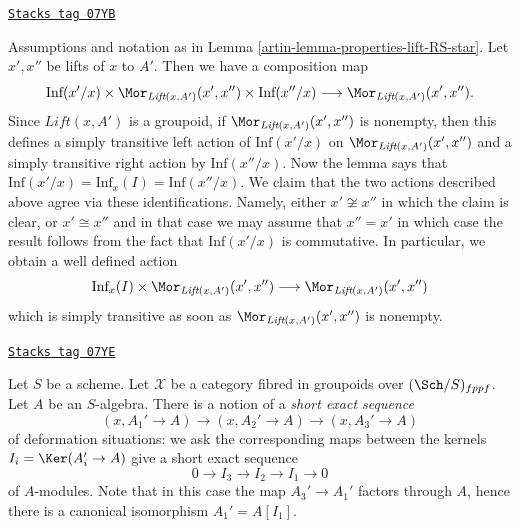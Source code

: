 \begin{remark}[Automorphisms]

\label{artin-remark-automorphisms}
\href{https://stacks.math.columbia.edu/tag/07YB}{\texttt{Stacks tag 07YB}}

Assumptions and notation as in Lemma \ref{artin-lemma-properties-lift-RS-star}.
Let $x', x''$ be lifts of $x$ to $A'$. Then we have a composition
map
$$
\text{Inf}(x'/x) \times
\Mor_{\textit{Lift}(x, A')}(x', x'') \times \text{Inf}(x''/x)
\longrightarrow
\Mor_{\textit{Lift}(x, A')}(x', x'').
$$
Since $\textit{Lift}(x, A')$ is a groupoid, if
$\Mor_{\textit{Lift}(x, A')}(x', x'')$ is nonempty, then this defines
a simply transitive left action of $\text{Inf}(x'/x)$ on
$\Mor_{\textit{Lift}(x, A')}(x', x'')$ and a simply transitive
right action by $\text{Inf}(x''/x)$. Now the lemma says that
$\text{Inf}(x'/x) = \text{Inf}_x(I) = \text{Inf}(x''/x)$.
We claim that the two actions described above agree via these identifications.
Namely, either $x' \not \cong x''$ in which the claim is clear, or
$x' \cong x''$ and in that case we may assume that $x'' = x'$ in which
case the result follows from the fact that $\text{Inf}(x'/x)$ is
commutative. In particular, we obtain a well defined action
$$
\text{Inf}_x(I) \times \Mor_{\textit{Lift}(x, A')}(x', x'')
\longrightarrow
\Mor_{\textit{Lift}(x, A')}(x', x'')
$$
which is simply transitive as soon as $\Mor_{\textit{Lift}(x, A')}(x', x'')$
is nonempty.
\end{remark}

\begin{remark}
\label{artin-remark-short-exact-sequence-thickenings}
\href{https://stacks.math.columbia.edu/tag/07YE}{\texttt{Stacks tag 07YE}}

Let $S$ be a scheme. Let $\mathcal{X}$ be a category
fibred in groupoids over $(\Sch/S)_{fppf}$. Let $A$ be an $S$-algebra. There
is a notion of a {\it short exact sequence}
$$
(x, A_1' \to A) \to (x, A_2' \to A) \to (x, A_3' \to A)
$$
of deformation situations: we ask the corresponding maps between
the kernels $I_i = \Ker(A_i' \to A)$ give a short exact sequence
$$
0 \to I_3 \to I_2 \to I_1 \to 0
$$
of $A$-modules. Note that in this case the map $A_3' \to A_1'$
factors through $A$, hence there is a canonical isomorphism
$A_1' = A[I_1]$.
\end{remark}

